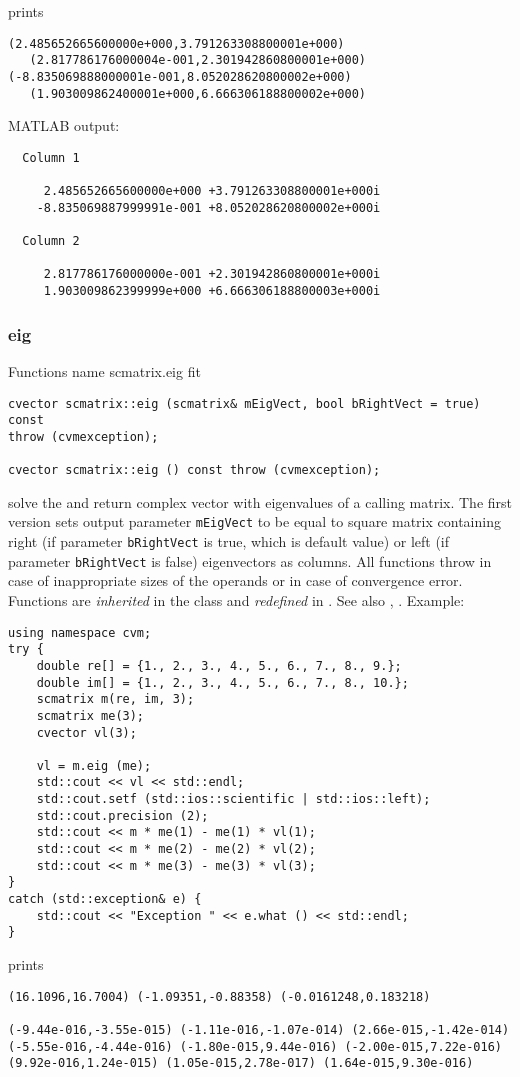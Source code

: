 prints
\begin{Verbatim}
(2.485652665600000e+000,3.791263308800001e+000)
   (2.817786176000004e-001,2.301942860800001e+000)
(-8.835069888000001e-001,8.052028620800002e+000)
   (1.903009862400001e+000,6.666306188800002e+000)
\end{Verbatim}
MATLAB output:
\begin{Verbatim}
  Column 1

     2.485652665600000e+000 +3.791263308800001e+000i
    -8.835069887999991e-001 +8.052028620800002e+000i

  Column 2

     2.817786176000000e-001 +2.301942860800001e+000i
     1.903009862399999e+000 +6.666306188800003e+000i
\end{Verbatim}
\newpage




\subsubsection{eig}
Functions%
\pdfdest name {scmatrix.eig} fit
\begin{verbatim}
cvector scmatrix::eig (scmatrix& mEigVect, bool bRightVect = true) const
throw (cvmexception);

cvector scmatrix::eig () const throw (cvmexception);
\end{verbatim}
solve the 
and return  complex vector with eigenvalues
of a calling matrix.
The first version
sets  output parameter \verb"mEigVect" to be equal
to  square matrix containing right (if parameter
\verb"bRightVect" is true, which is default value)
or left (if parameter
\verb"bRightVect" is false)
eigenvectors as columns.
All  functions
throw 
in case of inappropriate sizes of the operands
or in case of convergence error.
Functions are \emph{inherited} in the class
and \emph{redefined} in .
See also
,
.
Example:
\begin{Verbatim}
using namespace cvm;
try {
    double re[] = {1., 2., 3., 4., 5., 6., 7., 8., 9.};
    double im[] = {1., 2., 3., 4., 5., 6., 7., 8., 10.};
    scmatrix m(re, im, 3);
    scmatrix me(3);
    cvector vl(3);

    vl = m.eig (me);
    std::cout << vl << std::endl;
    std::cout.setf (std::ios::scientific | std::ios::left); 
    std::cout.precision (2);
    std::cout << m * me(1) - me(1) * vl(1);
    std::cout << m * me(2) - me(2) * vl(2);
    std::cout << m * me(3) - me(3) * vl(3);
}
catch (std::exception& e) {
    std::cout << "Exception " << e.what () << std::endl;
}
\end{Verbatim}
prints
\begin{Verbatim}
(16.1096,16.7004) (-1.09351,-0.88358) (-0.0161248,0.183218)

(-9.44e-016,-3.55e-015) (-1.11e-016,-1.07e-014) (2.66e-015,-1.42e-014)
(-5.55e-016,-4.44e-016) (-1.80e-015,9.44e-016) (-2.00e-015,7.22e-016)
(9.92e-016,1.24e-015) (1.05e-015,2.78e-017) (1.64e-015,9.30e-016)
\end{Verbatim}
\newpage




